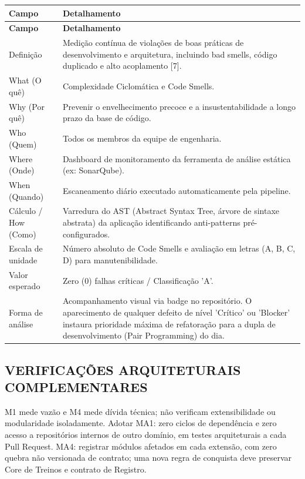 \begingroup
\small
\setlength{\tabcolsep}{4pt}
\renewcommand{\arraystretch}{1.2}
\begin{longtable}{|>{\raggedright\arraybackslash}p{}|>{\raggedright\arraybackslash}p{}|}
\hline
\textbf{Campo} & \textbf{Detalhamento} \\ \hline
\endfirsthead
\textbf{Campo} & \textbf{Detalhamento} \\ \hline
\endhead
Definição & Medição contínua de violações de boas práticas de desenvolvimento e arquitetura, incluindo bad smells, código duplicado e alto acoplamento [7]. \\ \hline
What (O quê) & Complexidade Ciclomática e Code Smells. \\ \hline
Why (Por quê) & Prevenir o envelhecimento precoce e a insustentabilidade a longo prazo da base de código. \\ \hline
Who (Quem) & Todos os membros da equipe de engenharia. \\ \hline
Where (Onde) & Dashboard de monitoramento da ferramenta de análise estática (ex: SonarQube). \\ \hline
When (Quando) & Escaneamento diário executado automaticamente pela pipeline. \\ \hline
Cálculo / How (Como) & Varredura do AST (Abstract Syntax Tree, árvore de sintaxe abstrata) da aplicação identificando anti-patterns pré-configurados. \\ \hline
Escala de unidade & Número absoluto de Code Smells e avaliação em letras (A, B, C, D) para manutenibilidade. \\ \hline
Valor esperado & Zero (0) falhas críticas / Classificação 'A'. \\ \hline
Forma de análise & Acompanhamento visual via badge no repositório. O aparecimento de qualquer defeito de nível 'Crítico' ou 'Blocker' instaura prioridade máxima de refatoração para a dupla de desenvolvimento (Pair Programming) do dia. \\ \hline
\end{longtable}
\endgroup


\subsection{VERIFICAÇÕES ARQUITETURAIS COMPLEMENTARES}
M1 mede vazão e M4 mede dívida técnica; não verificam extensibilidade ou modularidade isoladamente. Adotar MA1: zero ciclos de dependência e zero acesso a repositórios internos de outro domínio, em testes arquiteturais a cada Pull Request. MA4: registrar módulos afetados em cada extensão, com zero quebra não versionada de contrato; uma nova regra de conquista deve preservar Core de Treinos e contrato de Registro.


